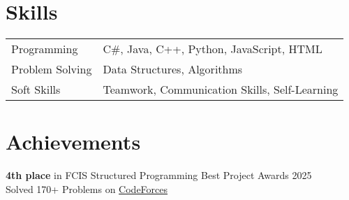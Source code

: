 \documentclass[a4paper,12pt]{article}
\begin{document}
\section{Skills}
\begin{tabularx}{\linewidth}{@{}l X@{}}
Programming &  C\#, Java, C++, Python, JavaScript, HTML\\ 
Problem Solving &  Data Structures, Algorithms\\
Soft Skills & Teamwork, Communication Skills, Self-Learning
\end{tabularx}
\section{Achievements}
 \textbf{4th place} in FCIS Structured Programming Best Project Awards 2025\\
 Solved 170+ Problems on \href{https://codeforces.com/profile/MohamedEid311}{CodeForces}

\vfill
{}
\end{document}
